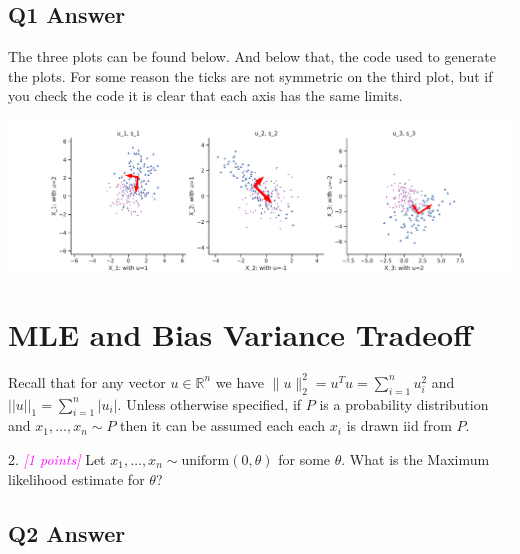 \documentclass{article}
\newcommand{\1}{\mathbf{1}}
\def\R{\mathbb{R}}
\newcommand{\grade}[1]{\small\textcolor{magenta}{\emph{[#1 points]}} \normalsize}
\begin{document}
\subsection{ Q1 Answer}
The three plots can be found below. And below that, the code used to generate the plots. For some reason the ticks are not symmetric on the third plot, but if you check the code it is clear that each axis has the same limits. 
\begin{center}
\includegraphics[width=\textwidth]{P1.pdf}
\end{center}







\section{MLE and Bias Variance Tradeoff}
Recall that for any vector $u \in \R^n$ we have $\|u\|_2^2 = u^T u = \sum_{i=1}^n u_i^2$ and $||u||_1 = \sum_{i=1}^n |u_i|$. 
Unless otherwise specified, if $P$ is a probability distribution and $x_1,\dots,x_n \sim P$ then it can be assumed each each $x_i$ is drawn iid from $P$. 

2. \grade{1}  Let $x_1,\dots,x_n \sim \text{uniform}(0,\theta)$ for some $\theta$. What is the Maximum likelihood estimate for $\theta$?\\





\subsection{Q2 Answer}
\end{document}
